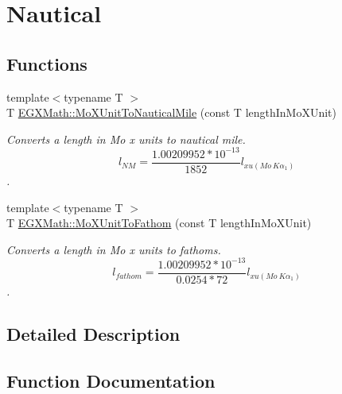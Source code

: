 \hypertarget{group___e_g_x_math-_conversions-_length_conversions-_non-_s_i-_mo_x_unit-_nautical}{}\section{Nautical}
\label{group___e_g_x_math-_conversions-_length_conversions-_non-_s_i-_mo_x_unit-_nautical}
\subsection*{Functions}
\begin{DoxyCompactItemize}
\item 
{\footnotesize template$<$typename T $>$ }\\T \mbox{\hyperlink{group___e_g_x_math-_conversions-_length_conversions-_non-_s_i-_mo_x_unit-_nautical_ga034fe0d8e6dbb0b0a588099a5b9d2c51}{E\+G\+X\+Math\+::\+Mo\+X\+Unit\+To\+Nautical\+Mile}} (const T length\+In\+Mo\+X\+Unit)
\begin{DoxyCompactList}\small\item\em Converts a length in Mo x units to nautical mile. \[ l_{NM}= \frac{1.00209952*10^{-13}}{1852} l_{xu(Mo\ K\alpha_1)} \]. \end{DoxyCompactList}\item 
{\footnotesize template$<$typename T $>$ }\\T \mbox{\hyperlink{group___e_g_x_math-_conversions-_length_conversions-_non-_s_i-_mo_x_unit-_nautical_gaac0c77d19dcc5ce04affa038de610b4a}{E\+G\+X\+Math\+::\+Mo\+X\+Unit\+To\+Fathom}} (const T length\+In\+Mo\+X\+Unit)
\begin{DoxyCompactList}\small\item\em Converts a length in Mo x units to fathoms. \[ l_{fathom}= \frac{1.00209952*10^{-13}}{0.0254 * 72} l_{xu(Mo\ K\alpha_1)} \]. \end{DoxyCompactList}\end{DoxyCompactItemize}


\subsection{Detailed Description}


\subsection{Function Documentation}
\mbox{\label{group___e_g_x_math-_conversions-_length_conversions-_non-_s_i-_mo_x_unit-_nautical_gaac0c77d19dcc5ce04affa038de610b4a}} 
